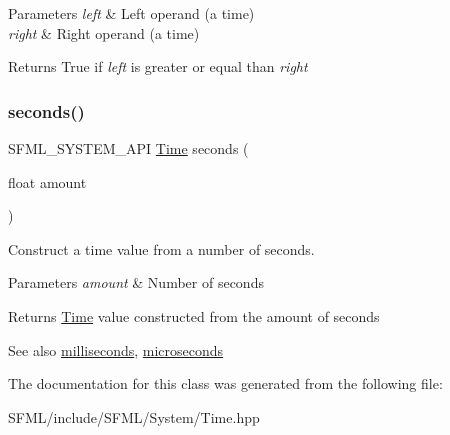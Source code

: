 \begin{DoxyParams}{Parameters}
{\em left} & Left operand (a time) \\
\hline
{\em right} & Right operand (a time)\\
\hline
\end{DoxyParams}
\begin{DoxyReturn}{Returns}
True if {\itshape left} is greater or equal than {\itshape right} \begin{DoxyVerb}\end{DoxyVerb}
 
\end{DoxyReturn}
\mbox{\label{classsf_1_1_time_ae36b9ef700f0ed0516abf0194ceb546b}} 
\subsubsection{\texorpdfstring{seconds()}{seconds()}}
{\footnotesize\ttfamily S\+F\+M\+L\+\_\+\+S\+Y\+S\+T\+E\+M\+\_\+\+A\+PI \mbox{\hyperlink{classsf_1_1_time}{Time}} seconds (\begin{DoxyParamCaption}\item[{float}]{amount }\end{DoxyParamCaption})\hspace{0.3cm}{\ttfamily [related]}}



Construct a time value from a number of seconds. 


\begin{DoxyParams}{Parameters}
{\em amount} & Number of seconds\\
\hline
\end{DoxyParams}
\begin{DoxyReturn}{Returns}
\mbox{\hyperlink{classsf_1_1_time}{Time}} value constructed from the amount of seconds
\end{DoxyReturn}
\begin{DoxySeeAlso}{See also}
\mbox{\hyperlink{classsf_1_1_time_ae379d420bc07170668f51522023957b9}{milliseconds}}, \mbox{\hyperlink{classsf_1_1_time_a951fd7219641f1e8191887f5dfe0dc31}{microseconds}} \begin{DoxyVerb}\end{DoxyVerb}
 
\end{DoxySeeAlso}


The documentation for this class was generated from the following file\+:\begin{DoxyCompactItemize}
\item 
S\+F\+M\+L/include/\+S\+F\+M\+L/\+System/Time.\+hpp\end{DoxyCompactItemize}
